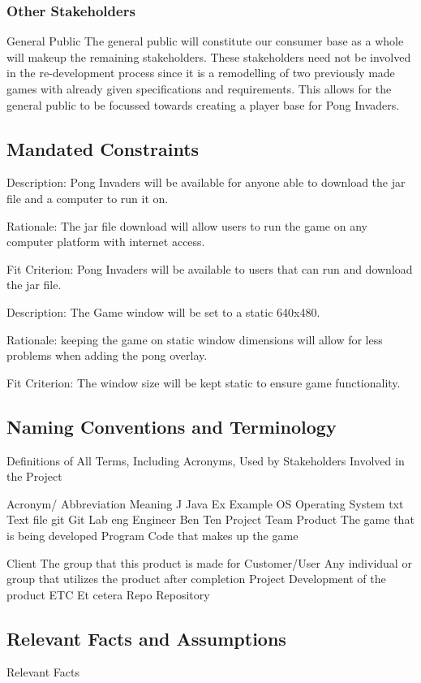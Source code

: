 \documentclass[12pt, titlepage]{article}
\begin{document}
\subsubsection{Other Stakeholders}
General Public
The general public will constitute our consumer base as a whole will makeup the remaining stakeholders. These stakeholders need not be involved in the re-development process since it is a remodelling of two previously made games with already given specifications and requirements. This allows for the general public to be focussed towards creating a player base for Pong Invaders. 
\subsection{Mandated Constraints}
Description: Pong Invaders will be available for anyone able to download the jar file and a computer to run it on.
 
Rationale: The jar file download will allow users to run the game on any computer platform with internet access.
 
Fit Criterion: Pong Invaders will be available to users that can run and download the jar file.
 

Description: The Game window will be set to a static 640x480.
 
Rationale: keeping the game on static window dimensions will allow for less problems when adding the pong overlay.
 
Fit Criterion: The window size will be kept static to ensure game functionality.

\subsection{Naming Conventions and Terminology}

Definitions of All Terms, Including Acronyms, Used by Stakeholders Involved in the Project

Acronym/ Abbreviation
Meaning
J
Java
Ex
Example
OS
Operating System
txt
Text file
git
Git Lab
eng
Engineer
Ben Ten
Project Team
Product
The game that is being developed
Program
Code that makes up the game

Client
The group that this product is made for
Customer/User
Any individual or group that utilizes the product after completion
Project
Development of the product
ETC
Et cetera
Repo
Repository

\subsection{Relevant Facts and Assumptions}
Relevant Facts
\end{document}
